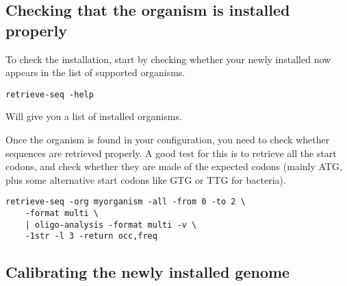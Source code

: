 \subsection{Checking that the organism is installed properly}

To check the installation, start by checking whether your newly
installed now appears in the list of supported organisms.

\begin{verbatim}
retrieve-seq -help
\end{verbatim}

Will give you a list of installed organisms.

Once the organism is found in your configuration, you need to check
whether sequences are retrieved properly. A good test for this is to
retrieve all the start codons, and check whether they are made of the
expected codons (mainly ATG, plus some alternative start codons like
GTG or TTG for bacteria).

\begin{verbatim}
retrieve-seq -org myorganism -all -from 0 -to 2 \
    -format multi \
    | oligo-analysis -format multi -v \
    -1str -l 3 -return occ,freq
\end{verbatim}

\subsection{Calibrating the newly installed genome}
